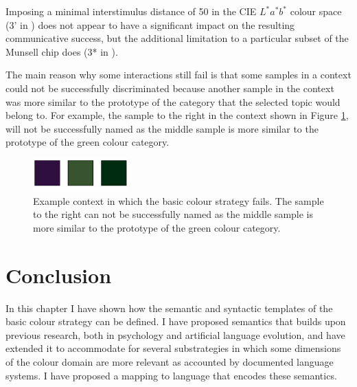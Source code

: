 Imposing a minimal interstimulus distance of 50 in the CIE $L^*a^*b^*$
colour space (3' in ) does not
appear to have a significant impact on the resulting communicative
success, but the additional limitation to a particular subset of the
Munsell chip does (3* in ).

The main reason why some interactions still fail is that some samples
in a context could not be successfully discriminated because another
sample in the context was more similar to the prototype of the
category that the selected topic would belong to. For example, the
sample to the right in the context shown in Figure
\ref{f:bcs-failure-context}, will not be successfully named as
the middle sample is more similar to the prototype of the green colour
category.

\begin{figure}
  \begin{center}
    \includegraphics[height=1.25cm]{./basic-strategy/figures/baseline-failure-context.pdf}
    \caption[Example context in which the basic colour strategy
    fails]{Example context in which the basic colour strategy
      fails. The sample to the right can not be successfully named as
      the middle sample is more similar to the prototype of the green
      colour category.}
    \label{f:bcs-failure-context}
  \end{center}
\end{figure}

\section{Conclusion}

In this chapter I have shown how the semantic and syntactic templates
of the basic colour strategy can be defined. I have proposed
semantics that builds upon previous research, both in psychology and
artificial language evolution, and have extended it to accommodate for
several substrategies in which some dimensions of the colour domain
are more relevant as accounted by documented language systems. I have
proposed a mapping to language that encodes these semantics.
